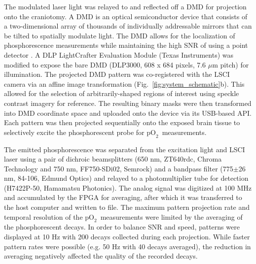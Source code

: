 \documentclass[12pt]{spieman}  %
\newcommand{\pO}{\ensuremath{\text{pO}_2}} 	            %
\begin{document}
\begin{spacing}{2}
The modulated laser light was relayed to and reflected off a DMD for projection onto the craniotomy. A DMD is an optical semiconductor device that consists of a two-dimensional array of thousands of individually addressable mirrors that can be tilted to spatially modulate light. The DMD allows for the localization of phosphorescence measurements while maintaining the high SNR of using a point detector \cite{Ponticorvo:2010uv}. A DLP LightCrafter Evaluation Module (Texas Instruments) was modified to expose the bare DMD (DLP3000, 608 x 684 pixels, 7.6 $\mu$m pitch) for illumination. The projected DMD pattern was co-registered with the LSCI camera via an affine image transformation (Fig.~\ref{fig:system_schematic}b). This allowed for the selection of arbitrarily-shaped regions of interest using speckle contrast imagery for reference. The resulting binary masks were then transformed into DMD coordinate space and uploaded onto the device via its USB-based API. Each pattern was then projected sequentially onto the exposed brain tissue to selectively excite the phosphorescent probe for \pO\ measurements.

The emitted phosphorescence was separated from the excitation light and LSCI laser using a pair of dichroic beamsplitters (650 nm, ZT640rdc, Chroma Technology and 750 nm, FF750-SDi02, Semrock) and a bandpass filter (775$\pm$26 nm, 84-106, Edmund Optics) and relayed to a photomultiplier tube for detection (H7422P-50, Hamamatsu Photonics). The analog signal was digitized at 100 MHz and accumulated by the FPGA for averaging, after which it was transferred to the host computer and written to file. The maximum pattern projection rate and temporal resolution of the \pO\ measurements were limited by the averaging of the phosphorescent decays. In order to balance SNR and speed, patterns were displayed at 10 Hz with 200 decays collected during each projection. While faster pattern rates were possible (e.g. 50 Hz with 40 decays averaged), the reduction in averaging negatively affected the quality of the recorded decays.



\end{spacing}
\end{document}

